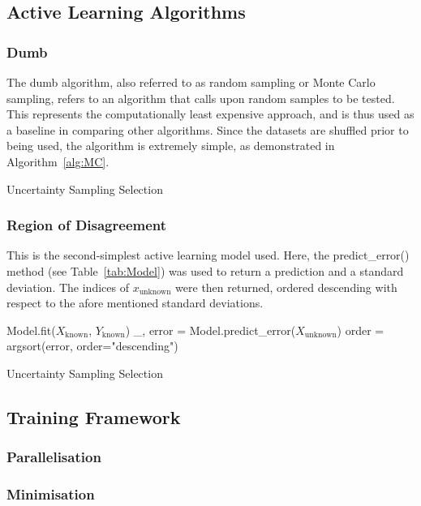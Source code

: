     \subsection{Active Learning Algorithms}

    \subsubsection{Dumb}

    The dumb algorithm, also referred to as random sampling or Monte Carlo sampling, refers to an algorithm that calls upon random samples to be tested. This represents the computationally least expensive approach, and is thus used as a baseline in comparing other algorithms. Since the datasets are shuffled prior to being used, the algorithm is extremely simple, as demonstrated in Algorithm~\ref{alg:MC}.

    \begin{algorithm}[h]
        \caption{Uncertainty Sampling Selection}
        \label{alg:MC}\SetAlgoLined
    \end{algorithm}

    \subsubsection{Region of Disagreement}
    This is the second-simplest active learning model used. Here, the predict\_error() method (see Table~\ref{tab:Model}) was used to return a prediction and a standard deviation. The indices of $x_\mathrm{unknown}$ were then returned, ordered descending with respect to the afore mentioned standard deviations.

\begin{algorithm}[h]
    Model.fit($X_\mathrm{known}$, $Y_\mathrm{known}$)\;
    \_, error = Model.predict\_error($X_\mathrm{unknown}$)\;
    order = argsort(error, order="descending")\;
    \caption{Uncertainty Sampling Selection}
    \label{alg:rod}\SetAlgoLined
\end{algorithm}

\subsection{Training Framework}
\blindtext[1]
\subsubsection{Parallelisation}
\blindtext[1]
\subsubsection{Minimisation}
\blindtext[1]


